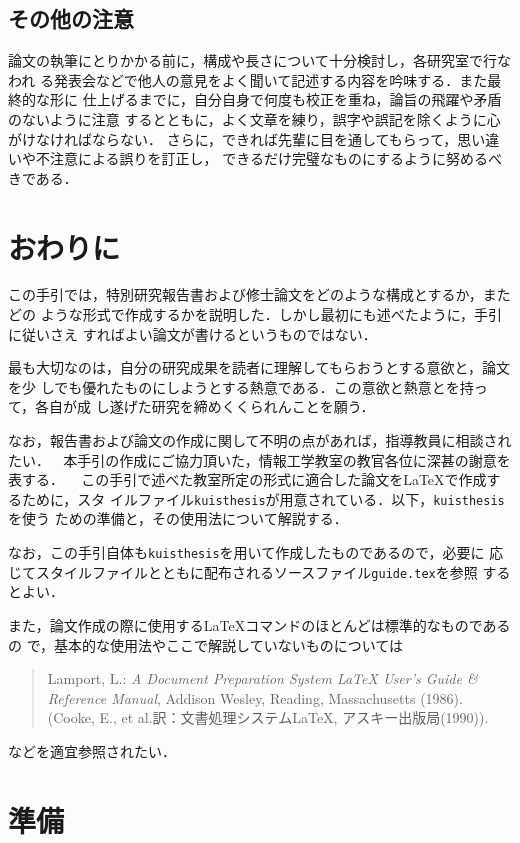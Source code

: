 \documentclass[master]{kuisthesis}		%
\def\|{\verb|}
\begin{document}
\subsection{その他の注意}\label{subsec-others}
論文の執筆にとりかかる前に，構成や長さについて十分検討し，各研究室で行なわれ
る発表会などで他人の意見をよく聞いて記述する内容を吟味する．また最終的な形に
仕上げるまでに，自分自身で何度も校正を重ね，論旨の飛躍や矛盾のないように注意
するとともに，よく文章を練り，誤字や誤記を除くように心がけなければならない．
さらに，できれば先輩に目を通してもらって，思い違いや不注意による誤りを訂正し，
できるだけ完璧なものにするように努めるべきである．

\section{おわりに}\label{sec-conclusion}
この手引では，特別研究報告書および修士論文をどのような構成とするか，またどの
ような形式で作成するかを説明した．しかし最初にも述べたように，手引に従いさえ
すればよい論文が書けるというものではない．

最も大切なのは，自分の研究成果を読者に理解してもらおうとする意欲と，論文を少
しでも優れたものにしようとする熱意である．この意欲と熱意とを持って，各自が成
し遂げた研究を締めくくられんことを願う．

なお，報告書および論文の作成に関して不明の点があれば，指導教員に相談されたい．

\acknowledgments				% 謝辞
本手引の作成にご協力頂いた，情報工学教室の教官各位に深甚の謝意を表する．

\nocite{*}
			% 文献スタイルの指定
				% 参考文献の出力

						% 付録の開始
この手引で述べた教室所定の形式に適合した論文を\LaTeX で作成するために，スタ
イルファイル\|kuisthesis|が用意されている．以下，\|kuisthesis|を使う
ための準備と，その使用法について解説する．

なお，この手引自体も\|kuisthesis|を用いて作成したものであるので，必要に
応じてスタイルファイルとともに配布されるソースファイル\|guide.tex|を参照
するとよい．

また，論文作成の際に使用する\LaTeX コマンドのほとんどは標準的なものであるの
で，基本的な使用法やここで解説していないものについては
\begin{quote}%
Lamport, L.: {\em A Document Preparation System {\LaTeX} User's Guide \&
Reference Manual\/}, Addison Wesley, Reading, Massachusetts (1986).
(Cooke, E., et al.訳：文書処理システム{\LaTeX}, アスキー出版局(1990)).
\end{quote}%
などを適宜参照されたい．

\section{準備}\label{app-prelim}
\end{document}
